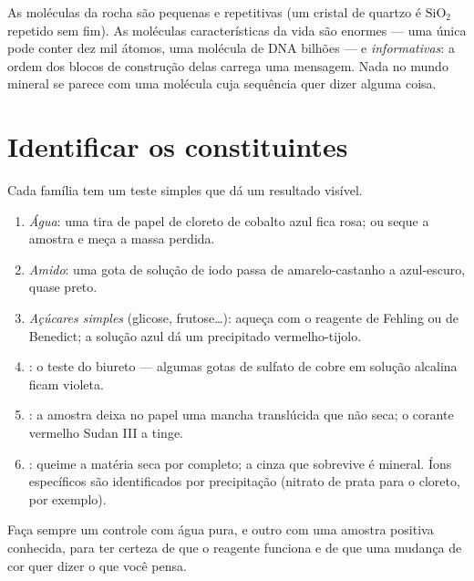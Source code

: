\begin{remark}\label{rem:g10:chemistry-of-life:macromolecules}
As moléculas da rocha são pequenas e repetitivas (um cristal de quartzo
é $\mathrm{SiO_2}$ repetido sem fim). As moléculas características da
vida são enormes --- uma única  pode conter dez mil átomos, uma
molécula de DNA bilhões --- e \emph{informativas}: a ordem dos blocos de
construção delas carrega uma mensagem. Nada no mundo mineral se parece
com uma molécula cuja sequência quer dizer alguma coisa.
\end{remark}

\section{Identificar os constituintes}

\begin{method}\label{met:g10:chemistry-of-life:tests}
Cada família tem um teste simples que dá um resultado visível.
\begin{enumerate}
  \item \emph{Água}: uma tira de papel de cloreto de cobalto azul fica
        rosa; ou seque a amostra e meça a massa perdida.
  \item \emph{Amido}: uma gota de solução de iodo passa de
        amarelo-castanho a azul-escuro, quase preto.
  \item \emph{Açúcares simples} (glicose, frutose\dots): aqueça com o
        reagente de Fehling ou de Benedict; a solução azul dá um
        precipitado vermelho-tijolo.
  \item \emph{}: o teste do biureto --- algumas gotas de
        sulfato de cobre em solução alcalina ficam violeta.
  \item \emph{}: a amostra deixa no papel uma mancha
        translúcida que não seca; o corante vermelho Sudan III a tinge.
  \item \emph{}: queime a matéria seca por completo; a
        cinza que sobrevive é mineral. Íons específicos são
        identificados por precipitação (nitrato de prata para o
        cloreto, por exemplo).
\end{enumerate}
Faça sempre um controle com água pura, e outro com uma amostra positiva
conhecida, para ter certeza de que o reagente funciona e de que uma
mudança de cor quer dizer o que você pensa.
\end{method}

